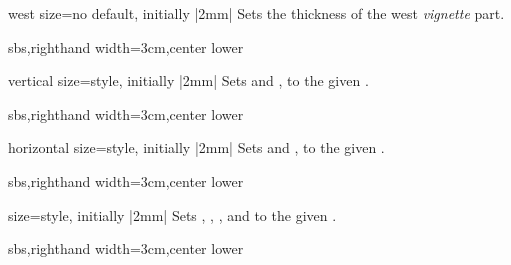 \begin{vigTcbKey}[][doc new=2016-04-22]{west size}{=}{no default, initially |2mm|}
  Sets the thickness of the west \emph{vignette} part.
\begin{dispExample*}{sbs,righthand width=3cm,center lower}
\end{dispExample*}
\end{vigTcbKey}

\clearpage

\begin{vigTcbKey}[][doc new=2016-04-22]{vertical size}{=}{style, initially |2mm|}
  Sets  and ,
  to the given .
\begin{dispExample*}{sbs,righthand width=3cm,center lower}
\end{dispExample*}
\end{vigTcbKey}

\begin{vigTcbKey}[][doc new=2016-04-22]{horizontal size}{=}{style, initially |2mm|}
  Sets  and ,
  to the given .
\begin{dispExample*}{sbs,righthand width=3cm,center lower}
\end{dispExample*}
\end{vigTcbKey}


\begin{vigTcbKey}[][doc new=2016-04-22]{size}{=}{style, initially |2mm|}
  Sets , ,
  , and  to the given .
\begin{dispExample*}{sbs,righthand width=3cm,center lower}
\end{dispExample*}
\end{vigTcbKey}


